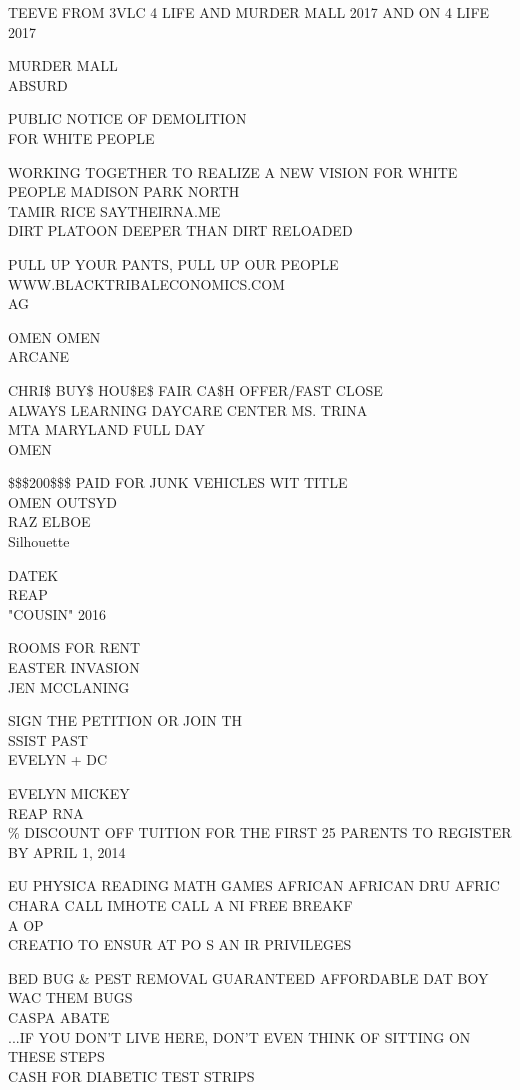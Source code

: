 \documentclass[10pt,letterpaper]{article}
\begin{document}
TEEVE FROM 3VLC 4 LIFE AND MURDER MALL 2017 AND ON 4 LIFE\\
2017

MURDER MALL\\
ABSURD

PUBLIC NOTICE OF DEMOLITION\\
FOR WHITE PEOPLE

WORKING TOGETHER TO REALIZE A NEW VISION FOR WHITE PEOPLE MADISON PARK NORTH\\
TAMIR RICE SAYTHEIRNA.ME\\
DIRT PLATOON DEEPER THAN DIRT RELOADED

PULL UP YOUR PANTS, PULL UP OUR PEOPLE WWW.BLACKTRIBALECONOMICS.COM\\
AG

OMEN OMEN\\
ARCANE

CHRI\$ BUY\$ HOU\$E\$ FAIR CA\$H OFFER/FAST CLOSE\\
ALWAYS LEARNING DAYCARE CENTER MS. TRINA\\
MTA MARYLAND FULL DAY\\
OMEN

\$\$\$200\$\$\$ PAID FOR JUNK VEHICLES WIT TITLE\\
OMEN OUTSYD\\
RAZ ELBOE\\
Silhouette

DATEK\\
REAP\\
"COUSIN" 2016

ROOMS FOR RENT\\
EASTER INVASION\\
JEN MCCLANING

SIGN THE PETITION OR JOIN TH\\
SSIST PAST\\
EVELYN + DC

EVELYN MICKEY\\
REAP RNA\\
\% DISCOUNT OFF TUITION FOR THE FIRST 25 PARENTS TO REGISTER BY APRIL 1, 2014

EU PHYSICA READING MATH GAMES AFRICAN AFRICAN DRU AFRIC CHARA CALL IMHOTE CALL A NI FREE BREAKF\\
A OP\\
CREATIO TO ENSUR AT PO S AN IR PRIVILEGES

BED BUG \& PEST REMOVAL GUARANTEED AFFORDABLE DAT BOY WAC THEM BUGS\\
CASPA ABATE\\
...IF YOU DON'T LIVE HERE, DON'T EVEN THINK OF SITTING ON THESE STEPS\\
CASH FOR DIABETIC TEST STRIPS
\end{document}
